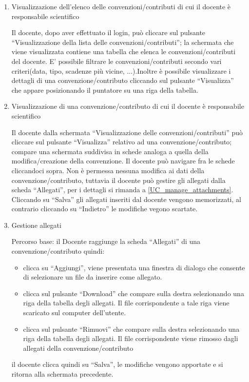 \begin{enumerate}
\begin{enumerate}
 
 \item Visualizzazione dell'elenco delle convenzioni/contributi di cui il docente è responsabile scientifico\\ \label{UC_view_own_contract_list}
 
 Il docente, dopo aver effettuato il login, può cliccare sul pulsante ``Visualizzazione della lista delle convenzioni/contributi''; la schermata
 che viene visualizzata contiene una tabella che elenca le convenzioni/contributi del docente. E' possibile filtrare le convenzioni/contributi
 secondo vari criteri(data, tipo, scadenze più vicine, ...).Inoltre è possibile visualizzare i dettagli di una convenzione/contributo cliccando sul
 pulsante ``Visualizza'' che appare posizionando il puntatore su una riga della tabella.
 
 \item Visualizzazione di una convenzione/contributo di cui il docente è responsabile scientifico\\ \label{UC_view_own_contract}
 
 Il docente dalla schermata ``Visualizzazione delle convenzioni/contributi'' può cliccare sul pulsante ``Visualizza'' relativo ad una convenzione/contributo; compare una schermata suddivisa in schede analoga a quella della modifica/creazione
 della convenzione. Il docente può navigare fra le schede cliccandoci sopra. Non è permessa nessuna modifica ai dati della convenzione/contributo, tuttavia il docente può gestire gli allegati dalla scheda ``Allegati'', per i dettagli
 si rimanda a \ref{UC_manage_attachments}. Cliccando su ``Salva''
 gli allegati inseriti dal docente vengono memorizzati, al contrario cliccando su ``Indietro'' le modifiche vegono scartate.
 
 \item Gestione allegati\\ \label{UC_manage_attachments}
  
 Percorso base:
 il Docente raggiunge la scheda ``Allegati'' di una convenzione/contributo quindi:
  \begin{itemize}
   \item clicca su ``Aggiungi'', viene presentata una finestra di dialogo che consente di selezionare un file da inserire come allegato.
   \item clicca sul pulsante ``Download'' che compare sulla destra selezionando una riga della tabella degli allegati. Il file corrispondente a tale riga viene scaricato sul computer dell'utente.
   \item clicca sul pulsante ``Rimuovi'' che compare sulla destra selezionando una riga della tabella degli allegati. Il file corrispondente viene rimosso dagli allegati della convenzione/contributo
  \end{itemize}
 il docente clicca quindi su ``Salva'', le modifiche vengono apportate e si ritorna alla schermata precedente.
 

\end{enumerate}
\end{enumerate}
